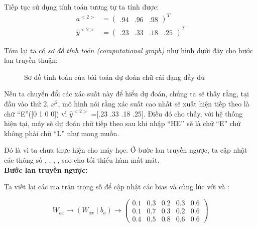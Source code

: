 Tiếp tục sử dụng tính toán tương tự ta tính được:
\begin{equation*}
    \begin{split}
    a^{<2>} & =  \begin{pmatrix}.94 & .96 &.98 \end{pmatrix}^{T} \\
    \widehat{y}^{<2>} & = \begin{pmatrix}.23 & .33 & .18 & .25 \end{pmatrix}^{T}
    \end{split}
\end{equation*}

Tóm lại ta có \textit{sơ đồ tính toán (computational graph)} như hình dưới đây cho bước lan truyền thuận:
\begin{figure}[!h]
    \begin{center}
        
    \end{center}
    \caption{Sơ đồ tính toán của bài toán dự đoán chữ cái dạng đầy đủ}
\end{figure}

Nếu ta chuyển đổi các xác suất này để hiểu dự đoán, chúng ta sẽ thấy rằng, tại đầu vào thứ 2, $x^{2}$, mô hình nói rằng xác suất cao nhất sẽ xuất hiện tiếp theo là chữ ``E''([0 1 0 0]) vì $\hat{y}^{<2>}$ =[.23  .33  .18  .25]. Điều đó cho thấy, với hệ thống hiện tại, máy sẽ dự đoán chữ tiếp theo sau khi nhập ``HE'’ sẽ là chữ ``E'' chứ không phải chữ ``L'' như mong muốn.

Đó là vì ta chưa thực hiện cho máy học. Ở bước lan truyền ngược, ta cập nhật các thông số \wax, \waa, \wya, \ba, \by \space sao cho tối thiểu hàm mất mát.\\

\textbf{Bước lan truyền ngược:}

Ta viết lại các ma trận trọng số để cập nhật các bias \ba và \by cùng lúc với \wax và \wya:

\begin{equation*}
W_{ax} \longrightarrow (W_{ax} \mid b_a) \longrightarrow \begin{pmatrix} 0.1 & 0.3 & 0.2 & 0.3 & 0.6\\0.1 & 0.7 & 0.3 & 0.2 & 0.6\\0.4 & 0.5 & 0.8 & 0.6 & 0.6 \end{pmatrix}
\end{equation*}

